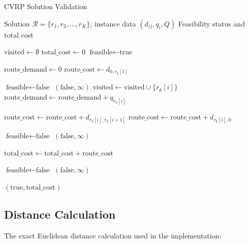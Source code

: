\documentclass[a4paper,twoside]{article}
\begin{document}
\begin{algorithm}
\caption{CVRP Solution Validation}
\begin{algorithmic}[1]
\REQUIRE Solution $\mathcal{R} = \{r_1, r_2, \ldots, r_K\}$, instance data $(d_{ij}, q_i, Q)$
\ENSURE Feasibility status and total cost

\STATE $\text{visited} \leftarrow \emptyset$ 
\STATE $\text{total\_cost} \leftarrow 0$
\STATE $\text{feasible} \leftarrow \text{true}$

    \STATE $\text{route\_demand} \leftarrow 0$
    \STATE $\text{route\_cost} \leftarrow d_{0, r_k[1]}$ 
    
            \STATE $\text{feasible} \leftarrow \text{false}$ 
            \RETURN $(\text{false}, \infty)$
        \ENDIF
        \STATE $\text{visited} \leftarrow \text{visited} \cup \{r_k[i]\}$
        \STATE $\text{route\_demand} \leftarrow \text{route\_demand} + q_{r_k[i]}$
        
            \STATE $\text{route\_cost} \leftarrow \text{route\_cost} + d_{r_k[i], r_k[i+1]}$
        \ELSE
            \STATE $\text{route\_cost} \leftarrow \text{route\_cost} + d_{r_k[i], 0}$ 
        \ENDIF
    \ENDFOR
    
        \STATE $\text{feasible} \leftarrow \text{false}$ 
        \RETURN $(\text{false}, \infty)$
    \ENDIF
    
    \STATE $\text{total\_cost} \leftarrow \text{total\_cost} + \text{route\_cost}$
\ENDFOR

    \STATE $\text{feasible} \leftarrow \text{false}$ 
    \RETURN $(\text{false}, \infty)$
\ENDIF

\RETURN $(\text{true}, \text{total\_cost})$
\end{algorithmic}
\end{algorithm}

\subsection{Distance Calculation}

The exact Euclidean distance calculation used in the implementation:
\end{document}
